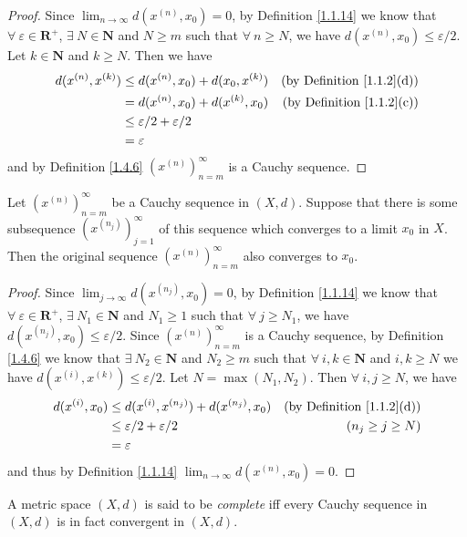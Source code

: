 \begin{proof}
    Since \(\lim_{n \to \infty} d(x^{(n)}, x_0) = 0\), by Definition \ref{1.1.14} we know that \(\forall\ \varepsilon \in \mathbf{R}^+\), \(\exists\ N \in \mathbf{N}\) and \(N \geq m\) such that \(\forall\ n \geq N\), we have \(d(x^{(n)}, x_0) \leq \varepsilon / 2\).
    Let \(k \in \mathbf{N}\) and \(k \geq N\).
    Then we have
    \begin{align*}
        d(x^{(n)}, x^{(k)}) & \leq d(x^{(n)}, x_0) + d(x_0, x^{(k)}) & \text{(by Definition \ref{1.1.2}(d))} \\
                            & = d(x^{(n)}, x_0) + d(x^{(k)}, x_0)    & \text{(by Definition \ref{1.1.2}(c))} \\
                            & \leq \varepsilon / 2 + \varepsilon / 2                                         \\
                            & = \varepsilon
    \end{align*}
    and by Definition \ref{1.4.6} \((x^{(n)})_{n = m}^\infty\) is a Cauchy sequence.
\end{proof}

\setcounter{theorem}{8}
\begin{lemma}\label{1.4.9}
    Let \((x^{(n)})_{n = m}^\infty\) be a Cauchy sequence in \((X, d)\).
    Suppose that there is some subsequence \((x^{(n_j)})_{j = 1}^\infty\) of this sequence which converges to a limit \(x_0\) in \(X\).
    Then the original sequence \((x^{(n)})_{n = m}^\infty\) also converges to \(x_0\).
\end{lemma}

\begin{proof}
    Since \(\lim_{j \to \infty} d(x^{(n_j)}, x_0) = 0\), by Definition \ref{1.1.14} we know that \(\forall\ \varepsilon \in \mathbf{R}^+\), \(\exists\ N_1 \in \mathbf{N}\) and \(N_1 \geq 1\) such that \(\forall\ j \geq N_1\), we have \(d(x^{(n_j)}, x_0) \leq \varepsilon / 2\).
    Since \((x^{(n)})_{n = m}^\infty\) is a Cauchy sequence, by Definition \ref{1.4.6} we know that \(\exists\ N_2 \in \mathbf{N}\) and \(N_2 \geq m\) such that \(\forall\ i, k \in \mathbf{N}\) and \(i, k \geq N\) we have \(d(x^{(i)}, x^{(k)}) \leq \varepsilon / 2\).
    Let \(N = \max(N_1, N_2)\).
    Then \(\forall\ i, j \geq N\), we have
    \begin{align*}
        d(x^{(i)}, x_0) & \leq d(x^{(i)}, x^{(n_j)}) + d(x^{(n_j)}, x_0) & \text{(by Definition \ref{1.1.2}(d))} \\
                        & \leq \varepsilon / 2 + \varepsilon / 2         & (n_j \geq j \geq N)                   \\
                        & = \varepsilon
    \end{align*}
    and thus by Definition \ref{1.1.14} \(\lim_{n \to \infty} d(x^{(n)}, x_0) = 0\).
\end{proof}

\begin{definition}\label{1.4.10}
    A metric space \((X, d)\) is said to be \emph{complete} iff every Cauchy sequence in \((X, d)\) is in fact convergent in \((X, d)\).
\end{definition}